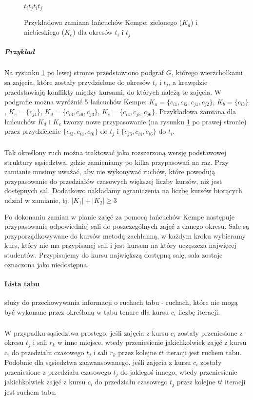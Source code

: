 \begin{enumerate}
\begin{figure}[H]
$t_i$\hspace{4.5cm}$t_j$\hspace{3.25cm}$t_i$\hspace{4.5cm}$t_j$ \\

\caption{Przykładowa zamiana łańcuchów Kempe: zielonego ($K_d$) i niebieskiego ($K_e$) dla okresów $t_i$ i $t_j$}
\label{fig:kempe_swap}
\end{figure}

\subparagraph{Przykład} 
Na rysunku \ref{fig:kempe_swap} po lewej stronie przedstawiono podgraf $G$, którego wierzchołkami są zajęcia, które zostały przydzielone do okresów $t_i$ i $t_j$, a krawędzie przedstawiają konflikty między kursami, do których należą te zajęcia. W podgrafie można wyróżnić 5 łańcuchów Kempe: $K_a = \{c_{i1}, c_{i2}, c_{j1}, c_{j2}\}$, $K_b = \{c_{i5}\}$, $K_c = \{c_{j4}\}$, $K_d = \{c_{i3}, c_{i6}, c_{j3}\}$, $K_e = \{c_{i4}, c_{j5}, c_{j6}\}$. Przykładowa zamiana dla łańcuchów $K_d$ i $K_e$ tworzy nowe przypasowanie (na rysunku \ref{fig:kempe_swap} po prawej stronie) przez przydzielenie $\{c_{i3}, c_{i4}, c_{i6}\}$ do $t_j$ i $\{c_{j3}, c_{i4}, c_{i6}\}$ do $t_i$.

\subparagraph{}Tak określony ruch można traktować jako rozszerzoną wersję podstawowej struktury sąsiedztwa, gdzie zamieniamy po kilka przypasowań na raz. Przy zamianie musimy uważać, aby nie wykonywać ruchów, które powodują przypasowanie do przedziałów czasowych większej liczby kursów, niż jest dostępnych sal. Dodatkowo nakładamy ograniczenia na liczbę kursów biorących udział w zamianie, tj. $|K_1|+ |K_2| \geq 3 $

\par Po dokonaniu zamian w planie zajęć za pomocą łańcuchów Kempe następuje przypasowanie odpowiedniej sali do poszczególnych zajęć z danego okresu. Sale są przyporządkowywane do kursów metodą zachłanną, w każdym kroku wybieramy kurs, który nie ma przypisanej sali i jest kursem na który uczęszcza najwięcej studentów. Przypisujemy do kursu największą dostępną salę, sala zostaje oznaczona jako niedostępna.

\end{enumerate}
\paragraph{Lista tabu} służy do przechowywania informacji o ruchach tabu - ruchach, które nie mogą być wykonane przez określoną w tabu tenure dla kursu $c_{i}$ liczbę iteracji.
\subparagraph{}W przypadku sąsiedztwa prostego, jeśli zajęcia z kursu $c_i$ zostały przeniesione z okresu $t_j$ i sali $r_k$ w inne miejsce, wtedy przeniesienie jakichkolwiek zajęć z kursu $c_i$ do przedziału czasowego $t_j$ i sali $r_k$ przez kolejne $tt$ iteracji jest ruchem tabu. Podobnie dla sąsiedztwa zaawansowanego, jeśli zajęcia z kursu $c_i$ zostały przeniesione z przedziału czasowego $t_j$ do jakiegoś innego, wtedy przeniesienie jakichkolwiek zajęć z kursu $c_i$ do przedziału czasowego $t_j$ przez kolejne $tt$ iteracji jest ruchem tabu.\\

